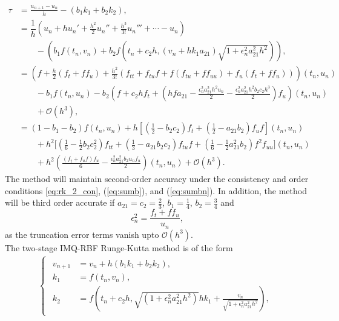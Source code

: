 \documentclass[a4paper, preprint,11pt]{elsarticle}
\numberwithin{equation}{section}
\begin{document}
\begin{align*}
\tau  &  =  \frac{u_{n+1}-u_{n}}{h} - (b_1k_1 + b_2k_2 ), \\
& = \dfrac{1}{h}\left (u_n + hu_n' + \frac{h^2}{2}u_n'' + \frac{h^3}{3!}u_n'''+\cdots - u_n \right)\\
& \qquad - \left(b_1f(t_n, v_n) + b_2f\left(t_n + c_2 h,(v_n + hk_1a_{21}) \sqrt{1 + \epsilon_n^2 a_{21}^2 h^2} \right)\right),\\
& =\left(f +\frac{h}{2}(f_t + ff_u) + \frac{h^2}{3!}(f_{tt} + f_{tu}f + f(f_{tu} + ff_{uu}) + f_u(f_t + ff_u))\right)(t_n,u_n)\\
& \qquad -b_1f(t_n,u_n)- b_2\left( f + c_2hf_t + \left( hfa_{21} - \frac{\epsilon_n^2a_{21}^2h^2u_n}{2} - \frac{\epsilon_n^2a_{21}^2h^2b_2c_2h^3}{2} \right)f_u \right)(t_n,u_n)\\
&\qquad+\mathcal{O}(h^3),\\
& =  \left(1 - b_1 - b_2\right) f(t_n,u_n) + h\left[\left( \frac{1}{2} - b_2 c_2 \right) f_t+ \left( \frac{1}{2} - a_{21} b_2 \right) f_u f \right](t_n,u_n) \\
&\qquad + h^2\bigg[\left( \frac{1}{6} - \frac{1}{2} b_2 c_2^2 \right) f_{tt} + \left( \frac{1}{3} - a_{21} b_2 c_2 \right) f_{tu} f + \left( \frac{1}{6} - \frac{1}{2} a_{21}^2 b_2 \right) f^2f_{uu}\bigg](t_n,u_n) \\
&\qquad + h^2\left(\frac{(f_t + f_u f)f_u}{6} - \frac{\epsilon_n^2 a_{21}^2 b_2 u_n f_u}{2}\right)(t_n,u_n)  +\mathcal{O}(h^3).
\end{align*}
The method will maintain second-order accuracy under the consistency and order conditions \eqref{eq:rk_2_con}, ({\ref{eq:sumb}}), and ({\ref{eq:sumbn}}). In addition, the method will be third order accurate if $a_{21} = c_2 = \frac{2}{3}$, $b_1 = \frac{1}{4}$, $ b_2 = \frac{3}{4}$ and 
\begin{equation*}
    \epsilon_n^2 = \dfrac{f_t + ff_u}{u_n},
\end{equation*}
as the truncation error terms vanish upto $\mathcal{O}(h^3).$\\
  The two-stage IMQ-RBF Runge-Kutta method is of the form
\begin{eqnarray}\label{eq:imq_2}
\begin{cases}
\begin{aligned}
    v_{n+1} &= v_n + h(b_1 k_1 + b_2 k_2),\\
     k_1 &= f(t_n, v_n),\\
     k_2 &= f\left(t_n + c_2 h, \sqrt{(1 + \epsilon_n^2 a_{21}^2 h^2)} h k_1 + \frac{v_n} {\sqrt{1 + \epsilon_n^2 a_{21}^2 h^2}}\right),
\end{aligned}    
\end{cases}    
\end{eqnarray}
\end{document}
